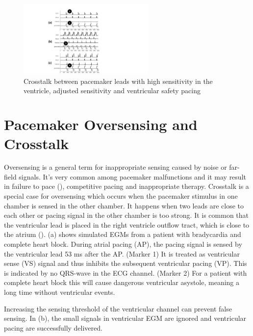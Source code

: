 \begin{figure}[t]
\center
\vspace{-10pt}
		\includegraphics[width=0.6\textwidth]{figs/crosstalk_all.pdf}
\caption{Crosstalk between pacemaker leads with high sensitivity in the ventricle, adjusted sensitivity and ventricular safety pacing}
\label{fig:crosstalk}
\end{figure}
\section{Pacemaker Oversensing and Crosstalk}
Oversensing is a general term for inappropriate sensing caused by noise or far-field signals. It's very common among pacemaker malfunctions and it may result in failure to pace (\cite{med2, leads}), competitive pacing and inappropriate therapy. Crosstalk is a special case for oversensing which occurs when the pacemaker stimulus in one chamber is sensed in the other chamber. It happens when two leads are close to each other or pacing signal in the other chamber is too strong. It is common that the ventricular lead is placed in the right ventricle outflow tract, which is close to the atrium (\cite{icd}). (a) shows simulated EGMs from a patient with bradycardia and complete heart block. During atrial pacing (AP), the pacing signal is sensed by the ventricular lead 53 ms after the AP. (Marker 1) It is treated as ventricular sense (VS) signal and thus inhibits the subsequent ventricular pacing (VP). This is indicated by no QRS-wave in the ECG channel. (Marker 2) For a patient with complete heart block this will cause dangerous ventricular asystole, meaning a long time without ventricular events.  

Increasing the sensing threshold of the ventricular channel can prevent false sensing. In (b), the small signals in ventricular EGM are ignored and ventricular pacing are successfully delivered. 


